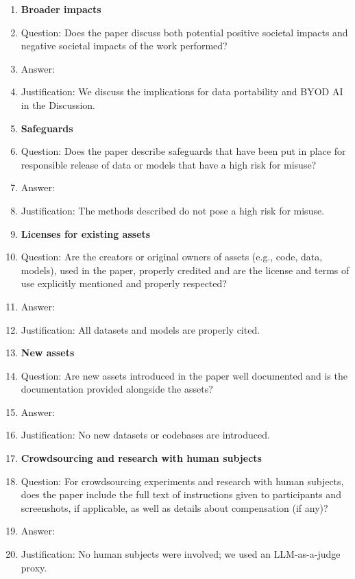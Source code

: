 \documentclass{article}
\begin{document}
\begin{enumerate}
\item {\bf Broader impacts}
    \item[] Question: Does the paper discuss both potential positive societal impacts and negative societal impacts of the work performed?
    \item[] Answer: \answerYes{}
    \item[] Justification: We discuss the implications for data portability and BYOD AI in the Discussion.

\item {\bf Safeguards}
    \item[] Question: Does the paper describe safeguards that have been put in place for responsible release of data or models that have a high risk for misuse?
    \item[] Answer: \answerNA{}
    \item[] Justification: The methods described do not pose a high risk for misuse.

\item {\bf Licenses for existing assets}
    \item[] Question: Are the creators or original owners of assets (e.g., code, data, models), used in the paper, properly credited and are the license and terms of use explicitly mentioned and properly respected?
    \item[] Answer: \answerYes{}
    \item[] Justification: All datasets and models are properly cited.

\item {\bf New assets}
    \item[] Question: Are new assets introduced in the paper well documented and is the documentation provided alongside the assets?
    \item[] Answer: \answerNA{}
    \item[] Justification: No new datasets or codebases are introduced.

\item {\bf Crowdsourcing and research with human subjects}
    \item[] Question: For crowdsourcing experiments and research with human subjects, does the paper include the full text of instructions given to participants and screenshots, if applicable, as well as details about compensation (if any)?
    \item[] Answer: \answerNA{}
    \item[] Justification: No human subjects were involved; we used an LLM-as-a-judge proxy.


\end{enumerate}
\end{document}
